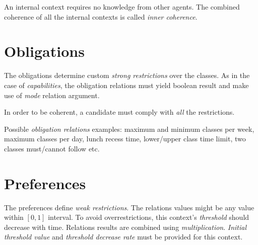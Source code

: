 \documentclass[../ThesisDoc]{subfiles}
\begin{document}
\providecommand{\rootdir}{..}
\providecommand{\seccmd}[1]{\section{#1}}

An internal context requires no knowledge from other agents.
The combined coherence of all the internal contexts is called
\emph{inner coherence}.

\seccmd{Obligations}

The obligations determine custom \emph{strong restrictions} over the classes.
As in the case of \emph{capabilities}, the obligation relations must yield
boolean result and make use of \emph{mode} relation argument.

In order to be coherent, a candidate must comply with \emph{all} the restrictions.

\medskip

Possible \emph{obligation relations} examples:
maximum and minimum classes per week, maximum classes per day,
lunch recess time, lower/upper class time limit, two classes must/cannot follow etc.


\seccmd{Preferences}

The preferences define \emph{weak restrictions}. The relations values might be any
value within $[0,1]$ interval. To avoid overrestrictions, this context's \emph{threshold}
should decrease with time. Relations results are combined using \emph{multiplication}.
\emph{Initial threshold value} and \emph{threshold decrease rate} must be
provided for this context.

\end{document}
